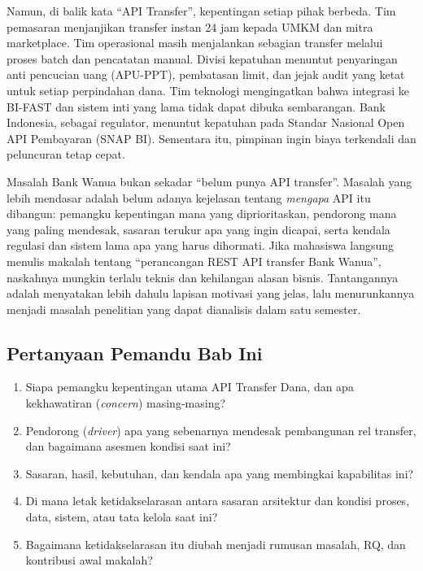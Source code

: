 Namun, di balik kata ``API Transfer'', kepentingan setiap pihak berbeda. Tim
pemasaran menjanjikan transfer instan 24 jam kepada UMKM dan mitra marketplace.
Tim operasional masih menjalankan sebagian transfer melalui proses batch dan
pencatatan manual. Divisi kepatuhan menuntut penyaringan anti pencucian uang
(APU-PPT), pembatasan limit, dan jejak audit yang ketat untuk setiap
perpindahan dana. Tim teknologi mengingatkan bahwa integrasi ke BI-FAST dan
sistem inti yang lama tidak dapat dibuka sembarangan. Bank Indonesia, sebagai
regulator, menuntut kepatuhan pada Standar Nasional Open API Pembayaran (SNAP
BI). Sementara itu, pimpinan ingin biaya terkendali dan peluncuran tetap cepat.

Masalah Bank Wanua bukan sekadar ``belum punya API transfer''. Masalah yang
lebih mendasar adalah belum adanya kejelasan tentang \emph{mengapa} API itu
dibangun: pemangku kepentingan mana yang diprioritaskan, pendorong mana yang
paling mendesak, sasaran terukur apa yang ingin dicapai, serta kendala regulasi
dan sistem lama apa yang harus dihormati. Jika mahasiswa langsung menulis
makalah tentang ``perancangan REST API transfer Bank Wanua'', naskahnya
mungkin terlalu teknis dan kehilangan alasan bisnis. Tantangannya adalah
menyatakan lebih dahulu lapisan motivasi yang jelas, lalu menurunkannya menjadi
masalah penelitian yang dapat dianalisis dalam satu semester.

\subsection*{Pertanyaan Pemandu Bab Ini}

\begin{enumerate}
  \item Siapa pemangku kepentingan utama API Transfer Dana, dan apa
        kekhawatiran (\emph{concern}) masing-masing?
  \item Pendorong (\emph{driver}) apa yang sebenarnya mendesak pembangunan rel
        transfer, dan bagaimana asesmen kondisi saat ini?
  \item Sasaran, hasil, kebutuhan, dan kendala apa yang membingkai kapabilitas
        ini?
  \item Di mana letak ketidakselarasan antara sasaran arsitektur dan kondisi
        proses, data, sistem, atau tata kelola saat ini?
  \item Bagaimana ketidakselarasan itu diubah menjadi rumusan masalah, RQ, dan
        kontribusi awal makalah?
\end{enumerate}

